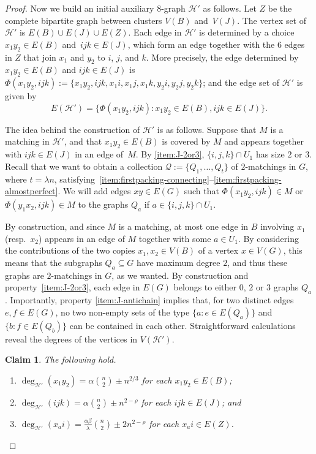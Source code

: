 \documentclass[a4paper, 11pt,reqno]{amsart}
\newcommand{\calQ}{\mathcal{Q}}
\theoremstyle{plain}
\newtheorem{claim}[theorem]{Claim}
\theoremstyle{definition}
\numberwithin{equation}{section}
\begin{document}
\begin{proof}
Now we build an initial auxiliary $8$-graph $\mathcal{H}'$ as follows.  
Let $Z$ be the complete bipartite graph between clusters $V(B)$ and~$V(J)$.  
The vertex set of $\mathcal{H}'$ is ${E(B) \cup E(J) \cup E(Z)}$.  
Each edge in $\mathcal{H}'$ is determined by a
choice $x_1 y_2 \in E(B)$ and~$ijk \in E(J)$, which form an edge
together with the $6$ edges in $Z$ that join $x_1$ and $y_2$ to
$i$, $j$, and $k$. More precisely, the edge determined by $x_1 y_2
\in E(B)$ and $ijk \in E(J)$ is $\Phi(x_1 y_2, ijk) := \{x_1 y_2,
ijk, x_1 i, x_1 j, x_1 k, y_2 i, y_2 j, y_2 k \}$; and the edge set
of $\mathcal{H}'$ is given by
\[
E(\mathcal{H}') = \{ \Phi(x_1 y_2, ijk) : x_1 y_2 \in E(B), ijk
\in E(J) \}.
\]

The idea behind the construction of $\mathcal{H}'$ is as follows.
Suppose that $M$ is a matching in $\mathcal{H}'$, and that $x_1 y_2 \in
E(B)$ is covered by $M$ and appears together with $ijk \in E(J)$ in
an edge of~$M$.
By \ref{item:J-2or3}, $\{i,j,k\} \cap U_1$ has size $2$ or $3$.
Recall that we want to obtain a collection 
$\calQ := \{Q_1, \dotsc, Q_t\}$ of $2$-matchings in $G$, where $t = \lambda n$,
satisfying~\ref{item:firstpacking-connecting}--\ref{item:firstpacking-almostperfect}.
We will add edges $xy \in E(G)$ such that $\Phi(x_1y_2,ijk) \in M$ or 
$\Phi(y_1x_2,ijk) \in M$ to the graphs $Q_a$ if $a \in \{i,j,k\} \cap U_1$.  

By construction, and since $M$ is a matching, at most one edge in $B$ involving 
$x_1$ (resp.~$x_2$) appears in an edge of $M$ together with some $a \in U_1$.  
By considering the contributions of the two copies $x_1, x_2 \in V(B)$ 
of a vertex $x \in V(G)$, this means that the subgraphs $Q_a \subseteq G$ 
have maximum degree $2$, and thus these graphs are $2$-matchings in $G$, 
as we wanted. By construction and property~\ref{item:J-2or3}, 
each edge in $E(G)$ belongs to either $0$, $2$ or $3$ graphs $Q_a$.  
Importantly, property \ref{item:J-antichain} implies that, 
for two distinct edges $e, f \in E(G)$, no two non-empty sets of the type 
$\{a : e \in E(Q_a)\}$ and $\{b : f \in E(Q_b)\}$ can be contained in each other.
Straightforward calculations reveal the degrees of the vertices in $V(\mathcal{H}')$.

\begin{claim}
	The following hold.
	\begin{enumerate}
		\item $\deg_{\mathcal{H}'}(x_1 y_2) = \alpha \binom{n}{2} \pm n^{2/3}$ for each $x_1 y_2 \in E(B)$;
		\item $\deg_{\mathcal{H}'}(ijk) = \alpha \binom{n}{2} \pm n^{2 - \rho}$ for each $ijk \in E(J)$; and
		\item $\deg_{\mathcal{H}'}(x_a i) = \frac{ \alpha\beta}{\lambda} \binom{n}{2} \pm 2n^{2 - \rho}$ for each $x_a i \in E(Z)$.
	\end{enumerate}
\end{claim}


\end{proof}
\end{document}
